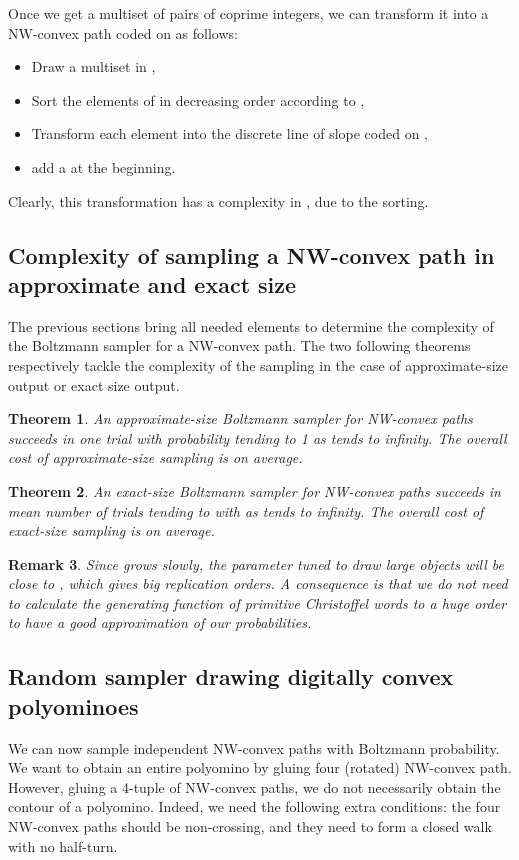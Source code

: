 \documentclass{article}
\newtheorem{theorem}{Theorem}[section]
\newtheorem{remark}[theorem]{Remark}
\begin{document}
Once we get a multiset of pairs of coprime integers, we can transform it into a NW-convex path coded on  as follows:
\begin{itemize}
\item Draw a multiset  in ,
\item Sort the elements  of  in decreasing order according to ,
\item Transform each element into the discrete line of slope  coded on ,
\item add a  at the beginning.
\end{itemize}
Clearly, this transformation has a complexity in , due to the sorting.

\subsection{Complexity of sampling a NW-convex path in approximate and exact size}

The previous sections bring all needed elements to determine the complexity of the Boltzmann sampler for a NW-convex path. 
The two following theorems respectively tackle the complexity of the sampling in the case of approximate-size output or exact size output.

\begin{theorem}
An approximate-size Boltzmann sampler for NW-convex paths succeeds in one trial with probability tending to 1 as  tends to infinity. 
The overall cost of approximate-size sampling is  on average.
\end{theorem}




\begin{theorem}
\label{theo3}
An exact-size Boltzmann sampler for NW-convex paths succeeds in mean number of trials tending to 
 with 
as  tends to infinity. The overall cost of exact-size sampling is  on average.
\end{theorem}

\begin{remark}
Since  grows slowly, the parameter  tuned to draw large objects will be close to , which gives big replication orders.
A consequence
is that we do not need to calculate the generating function of primitive Christoffel words to a huge order to have a good approximation of our probabilities.
\end{remark}
\subsection{Random sampler drawing digitally convex polyominoes}
We can now sample independent NW-convex paths with Boltzmann probability.
We want to obtain an entire polyomino by gluing four (rotated) NW-convex path. \\
However, gluing a 4-tuple of NW-convex paths, we do not necessarily obtain the contour of a polyomino.
 Indeed, we need the following extra conditions: the four NW-convex paths should be non-crossing, and they need to form a closed walk with no half-turn. \\
\end{document}
